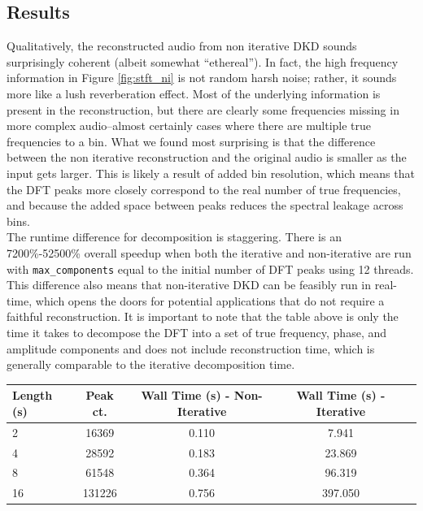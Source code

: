 \documentclass[11pt,twoside]{report}
\numberwithin{thm}{section}
\numberwithin{equation}{section}
\begin{document}
\subsection{Results}
Qualitatively, the reconstructed audio from non iterative DKD sounds surprisingly coherent (albeit somewhat ``ethereal''). In fact, the high frequency information in Figure \ref{fig:stft_ni} is not random harsh noise; rather, it sounds more like a lush reverberation effect. Most of the underlying information is present in the reconstruction, but there are clearly some frequencies missing in more complex audio--almost certainly cases where there are multiple true frequencies to a bin. What we found most surprising is that the difference between the non iterative reconstruction and the original audio is smaller as the input gets larger. This is likely a result of added bin resolution, which means that the DFT peaks more closely correspond to the real number of true frequencies, and because the added space between peaks reduces the spectral leakage across bins. \\

The runtime difference for decomposition is staggering. There is an 7200\%-52500\% overall speedup when both the iterative and non-iterative are run with \texttt{max\_components} equal to the initial number of DFT peaks using 12 threads. \\

This difference also means that non-iterative DKD can be feasibly run in real-time, which opens the doors for potential applications that do not require a faithful reconstruction. It is important to note that the table above is only the time it takes to decompose the DFT into a set of true frequency, phase, and amplitude components and does not include reconstruction time, which is generally comparable to the iterative decomposition time.\\

\begin{table}[h]
\centering
\begin{tabular}{|l|c|c|c|c|}
\hline
\textbf{Length (s)} & \textbf{Peak ct.} & \textbf{Wall Time (s) - Non-Iterative} & \textbf{Wall Time (s) - Iterative} \\
\hline
2 & 16369 &  0.110 & 7.941 \\
\hline
4 & 28592 & 0.183 & 23.869 \\
\hline
8 & 61548 & 0.364 & 96.319 \\
\hline
16 & 131226 & 0.756 & 397.050 \\
\hline
\end{tabular}
\end{table}
\end{document}

